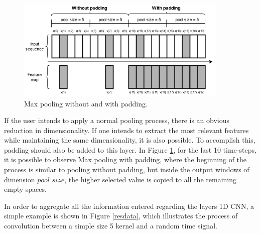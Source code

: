 \begin{figure}[h!]
    \centering
    \begin{center}
    \includegraphics[width=0.9\textwidth]{Images/maxpooling.png}
    \caption{Max pooling without and with padding.}
    \label{maxpooling}
    \end{center}
\end{figure}

If the user intends to apply a normal pooling process, there is an obvious reduction in dimensionality. If one intends to extract the most relevant features while maintaining the same dimensionality, it is also possible. To accomplish this, padding should also be added to this layer. In Figure \ref{maxpooling}, for the last 10 time-steps, it is possible to observe Max pooling with padding, where the beginning of the process is similar to pooling without padding, but inside the output windows of dimension $pool\_size$, the higher selected value is copied to all the remaining empty spaces. 

In order to aggregate all the information entered regarding the layers {1D CNN}, a simple example is shown in Figure \ref{resdata}, which illustrates the process of convolution between a simple size 5 kernel and a random time signal.

